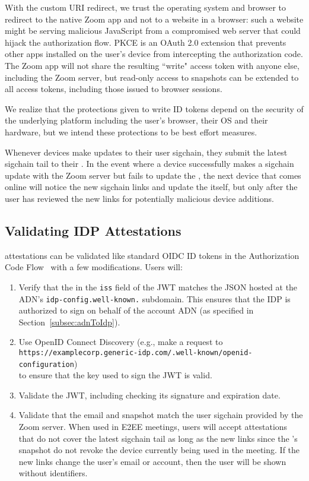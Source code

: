 With the custom URI redirect, we trust the operating system and browser to redirect to the native
Zoom app and not to a website in a browser: such a website might be serving malicious JavaScript
from a compromised web server that could hijack the authorization flow. PKCE is an OAuth 2.0
extension that prevents other apps installed on the user's device from intercepting the
authorization code. The Zoom app will not share the resulting ``write" access token with anyone
else, including the Zoom server, but read-only access to snapshots can be extended to all access
tokens, including those issued to browser sessions.

We realize that the protections given to write ID tokens depend on the security of the underlying
platform including the user's browser, their OS and their hardware, but we intend these protections
to be best effort measures.

Whenever devices make updates to their user sigchain, they submit the latest sigchain tail to their
\idp. In the event where a device successfully makes a sigchain update with the Zoom server but
fails to update the \idp, the next device that comes online will notice the new sigchain links and
update the \idp itself, but only after the user has reviewed the new links for potentially malicious
device additions.

\subsection{Validating IDP Attestations}

\idp attestations can be validated like standard OIDC ID tokens in the Authorization Code
Flow~\cite{oidc} with a few modifications. Users will:

\begin{enumerate}
\item Verify that the \idp in the \texttt{iss} field of the JWT matches the JSON hosted at the ADN's
    \texttt{idp-config.well-known.} subdomain. This ensures that the IDP is authorized to sign on
    behalf of the account ADN (as specified in Section~\ref{subsec:adnToIdp}).
\item Use OpenID Connect Discovery (e.g., make a request to \\
    \texttt{https://examplecorp.generic-idp.com/.well-known/openid-configuration}) \\ to ensure that
    the key used to sign the JWT is valid.
\item Validate the JWT, including checking its signature and expiration date.
\item Validate that the email and snapshot match the user sigchain provided by the Zoom server. When
    used in E2EE meetings, users will accept attestations that do not cover the latest sigchain tail
    as long as the new links since the {\idp}'s snapshot do not revoke the device currently being
    used in the meeting. If the new links change the user's email or account, then the user will be
    shown without identifiers.
\end{enumerate}

